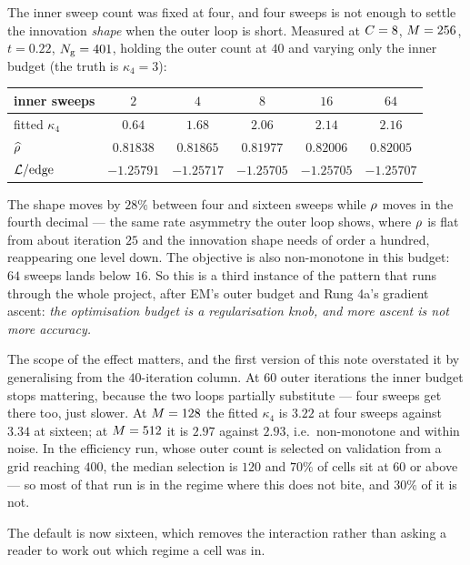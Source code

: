 \begin{pitfall}
The inner sweep count was fixed at four, and four sweeps is not enough to settle the
innovation \emph{shape} when the outer loop is short. Measured at $C=8$, $M=256$,
$t=0.22$, $N_{\mathrm{g}}=401$, holding the outer count at $40$ and varying only the inner budget
(the truth is $\kappa_4=3$):

\begin{center}\small
\begin{tabular}{@{}lccccc@{}}
\toprule
inner sweeps & $2$ & $4$ & $8$ & $16$ & $64$ \\
\midrule
fitted $\kappa_4$ & $0.64$ & $1.68$ & $2.06$ & $2.14$ & $2.16$ \\
$\widehat{\rho}$ & $0.81838$ & $0.81865$ & $0.81977$ & $0.82006$ & $0.82005$ \\
$\mathcal{L}/\text{edge}$ & $-1.25791$ & $-1.25717$ & $-1.25705$ & $-1.25705$ & $-1.25707$ \\
\bottomrule
\end{tabular}
\end{center}

\noindent
The shape moves by $28\%$ between four and sixteen sweeps while $\rho$ moves in the fourth
decimal --- the same rate asymmetry the outer loop shows, where $\rho$ is flat from about
iteration $25$ and the innovation shape needs of order a hundred, reappearing one level down.
The objective is also non-monotone in this budget: $64$ sweeps lands below
$16$. So this is a third instance of the pattern that runs through the whole project, after
EM's outer budget and Rung 4a's gradient ascent: \emph{the optimisation budget is a
regularisation knob, and more ascent is not more accuracy.}

The scope of the effect matters, and the first version of this note overstated it by
generalising from the $40$-iteration column. At $60$ outer iterations the inner budget stops
mattering, because the two loops partially substitute --- four sweeps get there too, just
slower. At $M=128$ the fitted $\kappa_4$ is $3.22$ at four sweeps against $3.34$ at
sixteen; at $M=512$ it is $2.97$ against $2.93$, i.e.\ non-monotone and within noise. In
the efficiency run, whose outer count is selected on validation from a grid reaching $400$,
the median selection is $120$ and $70\%$ of cells sit at $60$ or above --- so most of that run
is in the regime where this does not bite, and $30\%$ of it is not.

The default is now sixteen, which removes the interaction rather than asking a reader to
work out which regime a cell was in.
\end{pitfall}

